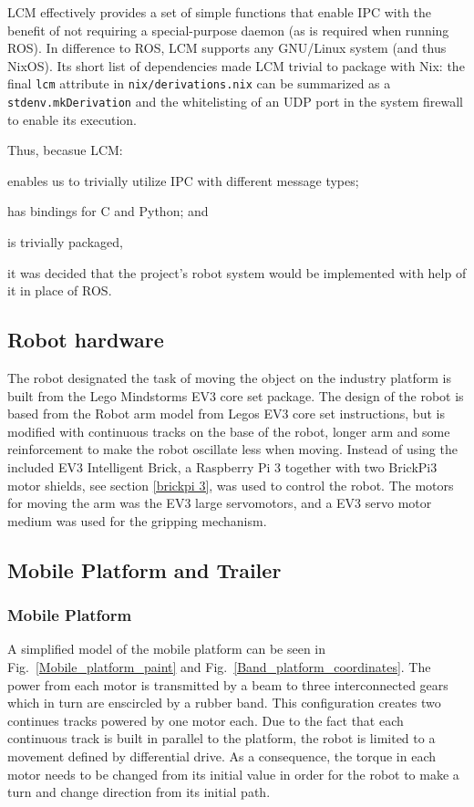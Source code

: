 LCM effectively provides a set of simple functions that enable IPC with the benefit of not requiring a special-purpose daemon (as is required when running ROS).
In difference to ROS, LCM supports any GNU/Linux system (and thus NixOS).
Its short list of dependencies made LCM trivial to package with Nix:
the final \texttt{lcm} attribute in \texttt{nix/derivations.nix} can be summarized as a \texttt{stdenv.mkDerivation} and the whitelisting of an UDP port in the system firewall to enable its execution.

Thus, becasue LCM:
\begin{inline-enum}
\item enables us to trivially utilize IPC with different message types;
\item has bindings for C and Python; and
\item is trivially packaged,
\end{inline-enum}
it was decided that the project's robot system would be implemented with help of it in place of ROS.

\subsection{Robot hardware}
The robot designated the task of moving the object on the industry platform is built from the Lego Mindstorms EV3 core set package. The design of the robot is based from the Robot arm model from Legos EV3 core set instructions, but is modified with continuous tracks on the base of the robot, longer arm and some reinforcement to make the robot oscillate less when moving. Instead of using the included EV3 Intelligent Brick, a Raspberry Pi 3 together with two BrickPi3 motor shields, see section \ref{brickpi 3}, was used to control the robot. The motors for moving the arm was the EV3 large servomotors, and a EV3 servo motor medium was used for the gripping mechanism.



\subsection {Mobile Platform and Trailer}
\subsubsection{Mobile Platform}
A simplified model of the mobile platform can be seen in Fig.~\ref{Mobile_platform_paint} and Fig.~\ref{Band_platform_coordinates}. The power from each motor is transmitted by a beam to three interconnected gears which in turn are enscircled by a rubber band. This configuration  creates two continues tracks powered by one motor each. Due to the fact that each continuous track is built in parallel to the platform, the robot is limited to a movement defined by differential drive. As a consequence, the torque in each motor needs to be changed from its initial value in order for the robot to make a turn and change direction from its initial path. 




